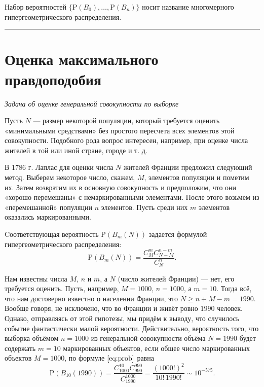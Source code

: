 \documentclass[11pt,a4paper]{article}
\renewcommand{\linethickness}{0.1ex}
\begin{document}
Набор вероятностей \(\{\mathrm{P}(B_0), \ldots,\mathrm{P}(B_n)\}\) носит
название многомерного гипергеометрического распределения.

    \begin{center}\rule{0.5\linewidth}{\linethickness}\end{center}

    \hypertarget{ux43eux446ux435ux43dux43aux430-ux43cux430ux43aux441ux438ux43cux430ux43bux44cux43dux43eux433ux43e-ux43fux440ux430ux432ux434ux43eux43fux43eux434ux43eux431ux438ux44f}{%
\section{Оценка максимального
правдоподобия}\label{ux43eux446ux435ux43dux43aux430-ux43cux430ux43aux441ux438ux43cux430ux43bux44cux43dux43eux433ux43e-ux43fux440ux430ux432ux434ux43eux43fux43eux434ux43eux431ux438ux44f}}

\emph{Задача об оценке генеральной совокупности по выборке}

    Пусть \(N\) --- размер некоторой популяции, который требуется оценить
«минимальными средствами» без простого пересчета всех элементов этой
совокупности. Подобного рода вопрос интересен, например, при оценке
числа жителей в той или иной стране, городе и т. д.

В 1786 г. Лаплас для оценки числа \(N\) жителей Франции предложил
следующий метод. Выберем некоторое число, скажем, \(M\), элементов
популяции и пометим их. Затем возвратим их в основную совокупность и
предположим, что они «хорошо перемешаны» с немаркированными элементами.
После этого возьмем из «перемешанной» популяции \(n\) элементов. Пусть
среди них \(m\) элементов оказались маркированными.

Cоответствующая вероятность \(\mathrm{P}(B_m(N))\) задается формулой
гипергеометрического распределения: \[
    \mathrm{P}(B_m(N)) = \frac{C_M^m C_{N-M}^{n-m}}{C_N^n}. \tag{1}\label{eq:prob}
\]

Нам известны числа \(M\), \(n\) и \(m\), а \(N\) (число жителей Франции)
--- нет, его требуется оценить. Пусть, например, \(M=1000\), \(n=1000\),
а \(m=10\). Тогда всё, что нам достоверно известно о населении Франции,
это \(N \ge n + M - m = 1990\). Вообще говоря, не исключено, что во
Франции и живёт ровно \(1990\) человек. Однако, отправляясь от этой
гипотезы, мы придём к выводу, что случилось событие фантастически малой
вероятности. Действительно, вероятность того, что выборка объёмом
\(n=1000\) из генеральной совокупности объёма \(N=1990\) будет содержать
\(m=10\) маркированных объектов, если общее число маркированных объектов
\(M=1000\), по формуле \(\eqref{eq:prob}\) равна \[
    \mathrm{P}(B_{10}(1990)) = \frac{C_{1000}^{10} C_{990}^{990}}{C_{1990}^{1000}} = \frac{(1000!)^2}{10! \, 1990!} \sim 10^{-575}.
\]
\end{document}
